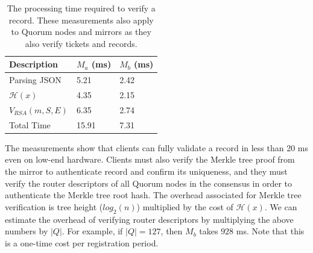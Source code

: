 \documentclass[USenglish,oneside,twocolumn]{article}
\begin{document}


\renewcommand{\arraystretch}{1.0}
\begin{table}[h]
	\small
	\vspace{-8px}
	\centering
	\begin{tabularx}{0.85\linewidth}{ | C{1} || C{1} || C{1} || }
		Description & $ M_{a} $ (ms) & $ M_{b} $ (ms) \\ \hline
		Parsing JSON & 5.21 & 2.42 \\ \hline
		$ \mathcal{H}(x) $ & 4.35 & 2.15 \\ \hline
		$ V_{\mathit{RSA}}(m, S, E) $ & 6.35 & 2.74 \\ \hline
		Total Time & 15.91 & 7.31 \\
	\end{tabularx}
	\caption{The processing time required to verify a record. These measurements also apply to Quorum nodes and mirrors as they also verify tickets and records.}\label{tab:verifytime}
	\vspace{-24px}
\end{table}

The measurements show that clients can fully validate a record in less than 20 ms even on low-end hardware. Clients must also verify the Merkle tree proof from the mirror to authenticate record and confirm its uniqueness, and they must verify the router descriptors of all Quorum nodes in the consensus in order to authenticate the Merkle tree root hash. The overhead associated for Merkle tree verification is tree height ($ log_2(n) $) multiplied by the cost of $ \mathcal{H}(x) $. We can estimate the overhead of verifying router descriptors by multiplying the above numbers by $ \left\vert{Q}\right\vert $. For example, if $ \left\vert{Q}\right\vert = 127 $, then $ M_{b} $ takes $928$ ms. Note that this is a one-time cost per registration period.
\end{document}
